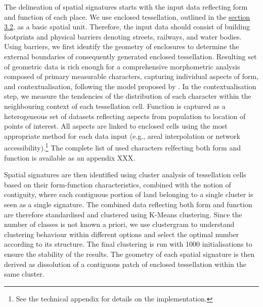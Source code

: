 

The delineation of spatial signatures starts with the input data reflecting form and
function of each place. We use enclosed tessellation, outlined in the
\hyperref[sec:ssec:ss_et]{section 3.2}, as a basic spatial unit. Therefore, the input
data should consist of building footprints and physical barriers denoting streets,
railways, and water bodies.
Using barriers, we first identify the geometry of enclosures to determine the external
boundaries of consequently generated enclosed tessellation.
Resulting set of geometric data is rich enough for a comprehensive morphometric analysis
composed of primary measurable characters, capturing individual aspects of form, and
contextualisation, following the model proposed by
\citealp{fleischmann2021methodological}. In the contextualisation step, we measure the
tendencies of the distribution of each character within the neighbouring context of each
tessellation cell.
Function is captured as a heterogeneous set of datasets reflecting aspects from
population to location of points of interest. All aspects are linked to enclosed cells
using the most appropriate method for each data input (e.g., areal interpolation or
network accessibility).\footnote{See the technical appendix for details on the
implementation.} The complete list of used characters relfecting both form and function
is available as an appendix XXX.


Spatial signatures are then identified using cluster analysis of tessellation cells
based on their form-function characteristics, combined with the notion of contiguity,
where each contiguous portion of land belonging to a single cluster is seen as a single
signature.
The combined data reflecting both form and function are therefore standardised and
clustered using K-Means clustering. Since the number of classes is not known a priori,
we use clustergram \citep{schonlau2002clustergram} to understand clustering behaviour
within different options and select the optimal number according to its structure.
The final clustering is run with 1000 initialisations to ensure the stability of the
results.
The geometry of each spatial signature is then derived as dissolution of a contiguous
patch of enclosed tessellation within the same cluster.


